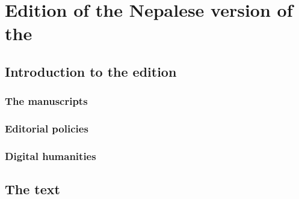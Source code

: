 \chapter{Edition of the Nepalese version of the \SS}

\section{Introduction to the edition}

\subsection{The manuscripts}

\subsection{Editorial policies}

\subsection{Digital humanities}

\section{The text}